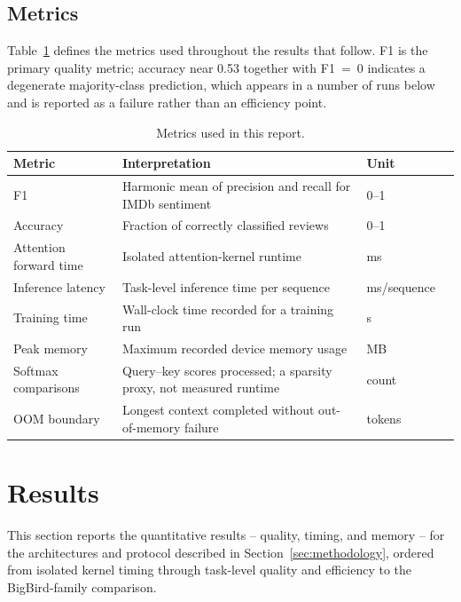 \documentclass[11pt]{article}
\begin{document}
\subsection{Metrics}
\label{sec:metrics}

Table~\ref{tab:metrics} defines the metrics used throughout the results that
follow. F1 is the primary quality metric; accuracy near 0.53 together with
F1~=~0 indicates a degenerate majority-class prediction, which appears in a
number of runs below and is reported as a failure rather than an efficiency
point.

\begin{table}[ht]
  \centering
  \small
  \caption{Metrics used in this report.}
  \label{tab:metrics}
  \begin{tabularx}{\textwidth}{@{}lXll@{}}
    \toprule
    Metric & Interpretation & Unit \\
    \midrule
    F1 & Harmonic mean of precision and recall for IMDb sentiment & 0--1  \\
    Accuracy & Fraction of correctly classified reviews & 0--1  \\
    Attention forward time & Isolated attention-kernel runtime & ms  \\
    Inference latency & Task-level inference time per sequence & ms/sequence  \\
    Training time & Wall-clock time recorded for a training run & s  \\
    Peak memory & Maximum recorded device memory usage & MB  \\
    Softmax comparisons & Query--key scores processed; a sparsity proxy, not
      measured runtime & count  \\
    OOM boundary & Longest context completed without out-of-memory failure
      & tokens  \\
    \bottomrule
  \end{tabularx}
\end{table}

\section{Results}
\label{sec:results}

This section reports the quantitative results -- quality, timing, and memory
-- for the architectures and protocol described in
Section~\ref{sec:methodology}, ordered from isolated kernel timing through
task-level quality and efficiency to the BigBird-family comparison.
\end{document}
